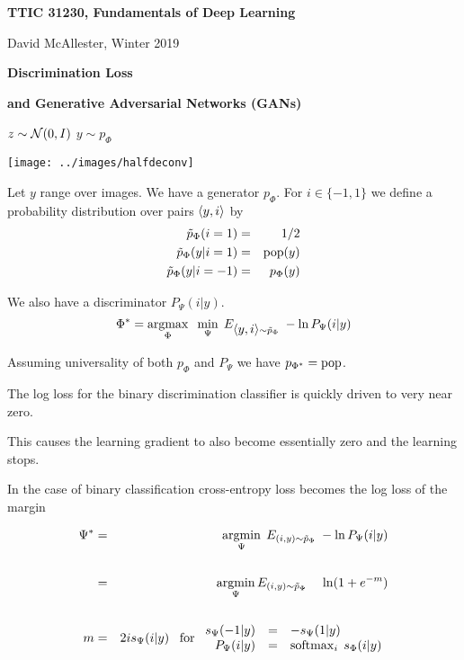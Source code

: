 





{\Huge

  \centerline{\bf TTIC 31230, Fundamentals of Deep Learning}
  \bigskip
  \centerline{David McAllester, Winter 2019}
  \vfill
  \centerline{\bf Discrimination Loss}
  \vfill
  \centerline{\bf and Generative Adversarial Networks (GANs)}
\vfill
\vfill

\centerline{$z\sim {\cal N}(0,I)$ \hspace{7em} $y\sim p_\Phi$}
\centerline{\texttt{[image: ../images/halfdeconv]}}





Let $y$ range over images.  We have a generator $p_\Phi$. For $i \in \{-1,1\}$ we define a probability distribution over pairs
${\mbox{$\langle y,i\rangle$}}$ by
\begin{eqnarray*}
\tilde{p}_\Phi(i = 1) & = & 1/2 \\
\tilde{p}_\Phi(y|i=1) & =&  \mathrm{pop}(y) \\
\tilde{p}_\Phi(y|i=-1) & = & p_\Phi(y)
\end{eqnarray*}

\vfill
We also have a discriminator $P_\Psi(i|y)$.
{\color{red} $$\Phi^* = \operatorname*{argmax}_\Phi\;\;\min_\Psi\;E_{{\mbox{$\langle y,i\rangle$}} \sim \tilde{p}_\Phi}\;-\ln P_\Psi(i|y)$$}

\vfill
\centerline{Assuming universality of both $p_\Phi$ and $P_\Psi$ we have {\color{red} $p_{\Phi^*} = \mathrm{pop}$}.}


The log loss for the binary discrimination classifier is quickly driven to very near zero.

\vfill
This causes the learning gradient to also become essentially zero and the learning stops.


In the case of binary classification cross-entropy loss becomes the log loss of the margin

\begin{eqnarray*}
\Psi^* & = & \operatorname*{argmin}_\Psi \;E_{(i,y) \sim \tilde{p}_\Phi}\;- \ln P_\Psi(i|y) \\
\\
& = & \operatorname*{argmin}_\Psi E_{(i,y) \sim \tilde{p}_\Phi}\;\;\;\;\ln(1 + e^{-m}) \\
\\
m & = & 2is_\Psi(i|y)\;\;\;\mbox{for $\begin{array}{rcl} s_\Psi(-1|y) & = & -s_\Psi(1|y) \\\;P_\Psi(i|y) & = & \operatorname*{softmax}_i\;s_\Phi(i|y) \end{array}$}
\end{eqnarray*}


}
